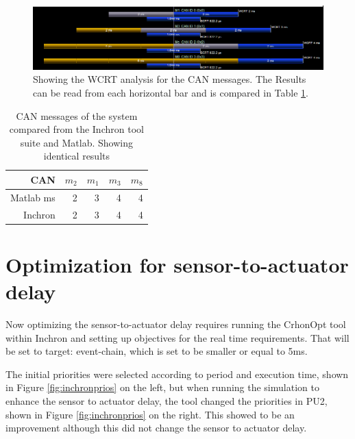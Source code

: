 \begin{figure}[h!]
	\begin{center}
		\includegraphics[width=\linewidth]{img/messagesCANtimings}
		\caption{Showing the WCRT analysis for the CAN messages. The Results can be read from each horizontal bar and is compared in Table \ref{tab:can-rts}.}
		\label{fig:msgCANtiming}
	\end{center}
\end{figure}

\begin{table}[htbp!]
	\centering
	\caption{CAN messages of the system compared from the Inchron tool suite and Matlab. Showing identical results}
	\begin{tabular}{rrrrr}
		\toprule
		CAN     & $m_2$   & $m_1$   & $m_3$   & $m_8$ \\
		\midrule
		Matlab ms & 2       & 3       & 4       & 4 \\
		Inchron & 2       & 3       & 4       & 4 \\
		\bottomrule
	\end{tabular}%
	\label{tab:can-rts}%
\end{table}%


\pagebreak

\section{Optimization for sensor-to-actuator delay}

Now optimizing the sensor-to-actuator delay requires running the CrhonOpt tool within Inchron and setting up objectives for the real time requirements. That will be set to target: event-chain, which is set to be smaller or equal to 5ms.

The initial priorities were selected according to period and execution time, shown in Figure \ref{fig:inchronprios} on the left, but when running the simulation to enhance the sensor to actuator delay, the tool changed the priorities in PU2, shown in Figure \ref{fig:inchronprios} on the right. This showed to be an improvement although this did not change the sensor to actuator delay.

